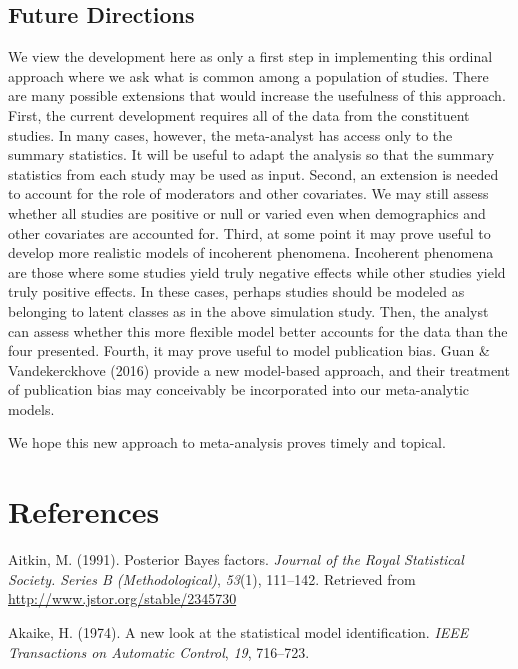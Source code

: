 \documentclass[english,man]{apa6}
\theoremstyle{definition}
\theoremstyle{definition}
\theoremstyle{remark}
\begin{document}
\subsection{Future Directions}\label{future-directions}

We view the development here as only a first step in implementing this
ordinal approach where we ask what is common among a population of
studies. There are many possible extensions that would increase the
usefulness of this approach. First, the current development requires all
of the data from the constituent studies. In many cases, however, the
meta-analyst has access only to the summary statistics. It will be
useful to adapt the analysis so that the summary statistics from each
study may be used as input. Second, an extension is needed to account
for the role of moderators and other covariates. We may still assess
whether all studies are positive or null or varied even when
demographics and other covariates are accounted for. Third, at some
point it may prove useful to develop more realistic models of incoherent
phenomena. Incoherent phenomena are those where some studies yield truly
negative effects while other studies yield truly positive effects. In
these cases, perhaps studies should be modeled as belonging to latent
classes as in the above simulation study. Then, the analyst can assess
whether this more flexible model better accounts for the data than the
four presented. Fourth, it may prove useful to model publication bias.
Guan \& Vandekerckhove (2016) provide a new model-based approach, and
their treatment of publication bias may conceivably be incorporated into
our meta-analytic models.

We hope this new approach to meta-analysis proves timely and topical.

\newpage

\section*{References}\label{references}

\hypertarget{refs}{}
\hypertarget{ref-Aitkin:1991}{}
Aitkin, M. (1991). Posterior Bayes factors. \emph{Journal of the Royal
Statistical Society. Series B (Methodological)}, \emph{53}(1), 111--142.
Retrieved from \url{http://www.jstor.org/stable/2345730}

\hypertarget{ref-Akaike:1974}{}
Akaike, H. (1974). A new look at the statistical model identification.
\emph{IEEE Transactions on Automatic Control}, \emph{19}, 716--723.
\end{document}
